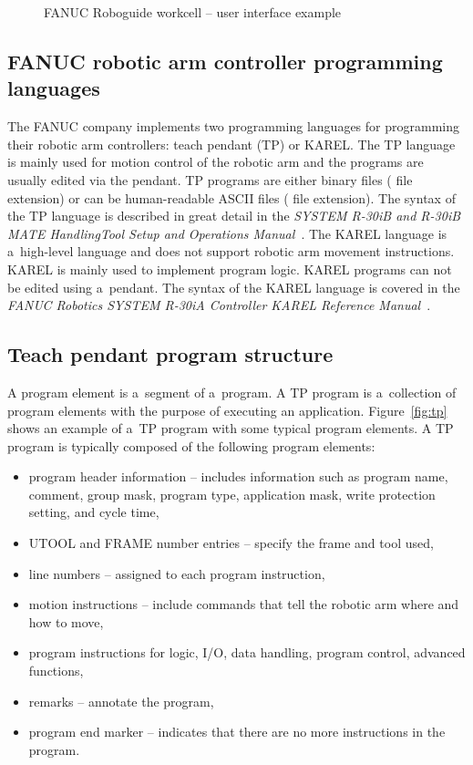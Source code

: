 \begin{figure}[h]
    \centering
    \noindent{}
    \caption{FANUC Roboguide workcell -- user interface example}
    \label{fig:roboguide}
\end{figure}

\subsection{FANUC robotic arm controller programming languages}

The FANUC company implements two programming languages for programming their robotic arm controllers: teach pendant (TP) or KAREL. The TP language is mainly used for motion control of the robotic arm and the programs are usually edited via the pendant. TP programs are either binary files ( file extension) or can be human-readable ASCII files ( file extension). The syntax of the TP language is described in great detail in the \emph{SYSTEM R-30iB and R-30iB MATE HandlingTool Setup and Operations Manual}~\cite{fanuchandling}. The KAREL language is a~high-level language and does not support robotic arm movement instructions. KAREL is mainly used to implement program logic. KAREL programs can not be edited using a~pendant. The syntax of the KAREL language is covered in the \emph{FANUC Robotics SYSTEM R-30iA Controller KAREL Reference Manual}~\cite{karelmanual}.



\subsection{Teach pendant program structure}

A program element is a~segment of a~program. A TP program is a~collection of program elements with the purpose of executing an application.  Figure~\ref{fig:tp} shows an example of a~TP program with some typical program elements. A TP program is typically composed of the following program elements:

\begin{itemize}

\item program header information -- includes information such as program name, comment, group mask, program type, application mask, write protection setting, and cycle time, 
\item UTOOL and FRAME number entries -- specify the frame and tool used,
\item line numbers -- assigned to each program instruction,
\item motion instructions -- include commands that tell the robotic arm where and how to move,
\item program instructions for logic, I/O, data handling, program control, advanced functions,
\item remarks -- annotate the program,
\item program end marker -- indicates that there are no more instructions in the program.

\end{itemize}

